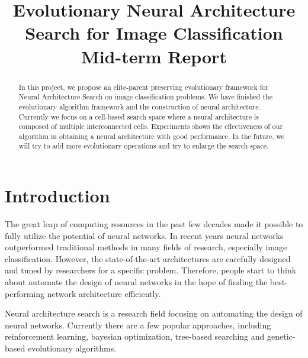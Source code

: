 \documentclass[conference]{IEEEtran}
\begin{document}
  
  \title{Evolutionary Neural Architecture Search for Image Classification \\ Mid-term Report}
  
  \author{
  }
  
  \maketitle
  
  \begin{abstract}
  In this project, we propose an elite-parent preserving evolutionary framework for Neural Architecture Search on image classification problems. We have finished the evolutionary algorithm framework and the construction of neural architecture. Currently we focus on a cell-based search space where a neural architecture is composed of multiple interconnected cells. Experiments shows the effectiveness of our algorithm in obtaining a neural architecture with good performance. In the future, we will try to add more evolutionary operations and try to enlarge the search space.
  \end{abstract}
  \IEEEpeerreviewmaketitle
  
  \section{Introduction}
      The great leap of computing resources in the past few decades made it possible to fully utilize the potential of neural networks. In recent years neural networks outperformed traditional methods in many fields of research, especially image classification. However, the state-of-the-art architectures are carefully designed and tuned by researchers for a specific problem. Therefore, people start to think about automate the design of neural networks in the hope of finding the best-performing network architecture efficiently.

      Neural architecture search is a research field focusing on automating the design of neural networks. Currently there are a few popular approaches, including reinforcement learning, bayesian optimization, tree-based searching and genetic-based evolutionary algorithms. 
\end{document}
